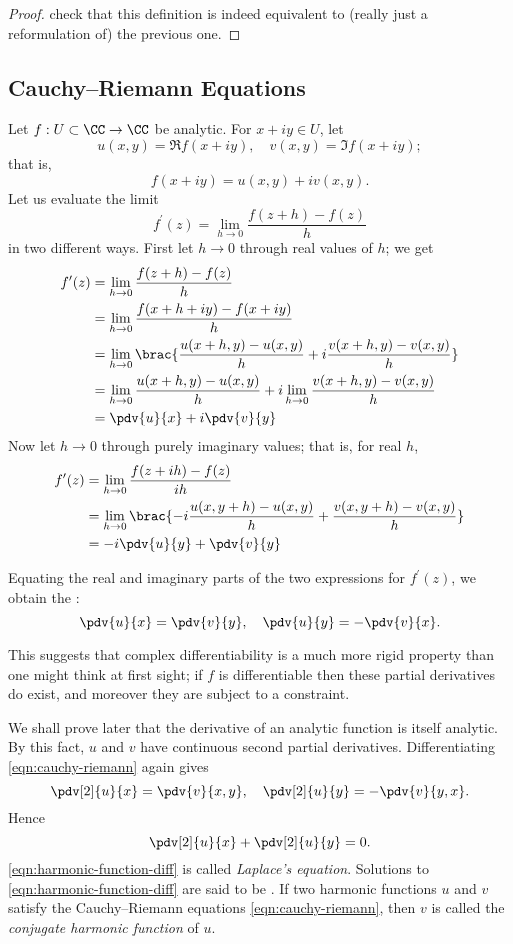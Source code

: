 \begin{proof}
check that this definition is indeed equivalent to (really just a reformulation of) the previous one.
\end{proof}

\subsection{Cauchy--Riemann Equations}
Let $f:U\subset\CC\to\CC$ be analytic. For $x+iy\in U$, let
\[u(x,y)=\Re f(x+iy),\quad v(x,y)=\Im f(x+iy);\]
that is,
\[f(x+iy)=u(x,y)+iv(x,y).\]
Let us evaluate the limit
\[f^\prime(z)=\lim_{h\to0}\frac{f(z+h)-f(z)}{h}\]
in two different ways. First let $h\to0$ through real values of $h$; we get
\begin{align*}
f^\prime(z)&=\lim_{h\to0}\frac{f(z+h)-f(z)}{h}\\
&=\lim_{h\to0}\frac{f(x+h+iy)-f(x+iy)}{h}\\
&=\lim_{h\to0}\brac{\frac{u(x+h,y)-u(x,y)}{h}+i\frac{v(x+h,y)-v(x,y)}{h}}\\
&=\lim_{h\to0}\frac{u(x+h,y)-u(x,y)}{h}+i\lim_{h\to0}\frac{v(x+h,y)-v(x,y)}{h}\\
&=\pdv{u}{x}+i\pdv{v}{y}
\end{align*}
Now let $h\to0$ through purely imaginary values; that is, for real $h$,
\begin{align*}
f^\prime(z)
&=\lim_{h\to0}\frac{f(z+ih)-f(z)}{ih}\\
&=\lim_{h\to0}\brac{-i\frac{u(x,y+h)-u(x,y)}{h}+\frac{v(x,y+h)-v(x,y)}{h}}\\
&=-i\pdv{u}{y}+\pdv{v}{y}
\end{align*}

Equating the real and imaginary parts of the two expressions for $f^\prime(z)$, we obtain the :
\begin{equation}\label{eqn:cauchy-riemann}
\pdv{u}{x}=\pdv{v}{y},\quad\pdv{u}{y}=-\pdv{v}{x}.
\end{equation}

\begin{remark}
This suggests that complex differentiability is a much more rigid property than one might think at first sight; if $f$ is differentiable then these partial derivatives do exist, and moreover they are subject to a constraint.
\end{remark}

We shall prove later that the derivative of an analytic function is itself analytic. By this fact, $u$ and $v$ have continuous second partial derivatives. Differentiating \cref{eqn:cauchy-riemann} again gives
\[\pdv[2]{u}{x}=\pdv{v}{x,y},\quad\pdv[2]{u}{y}=-\pdv{v}{y,x}.\]
Hence
\begin{equation}\label{eqn:harmonic-function-diff}
\pdv[2]{u}{x}+\pdv[2]{u}{y}=0.
\end{equation}
\cref{eqn:harmonic-function-diff} is called \emph{Laplace's equation}. Solutions to \cref{eqn:harmonic-function-diff} are said to be . If two harmonic functions $u$ and $v$ satisfy the Cauchy--Riemann equations \cref{eqn:cauchy-riemann}, then $v$ is called the \emph{conjugate harmonic function} of $u$.

